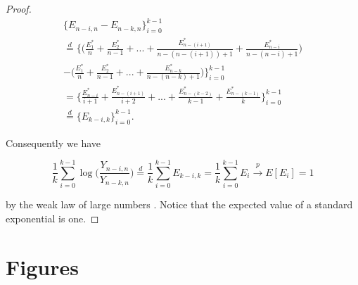 \documentclass[english,12pt,a4paper,pdftex,sci,utf8]{aaltothesis} %
\begin{document}
\begin{proof}
\begin{equation*}
\begin{split}
\big\{E_{n-i,n} - E_{n-k,n}\big\}_{i=0}^{k-1} \\ 
\overset{d}{=} \bigg\{\Big( \frac{E_1^*}{n} + \frac{E_2^*}{n-1}+...+ \frac{E_{n-(i+1)}^*}{n-(n-(i+1))+1} + \frac{E_{n-i}^*}{n-(n-i)+1} \Big) \\
- \Big(\frac{E_1^*}{n} + \frac{E_2^*}{n-1}+...+\frac{E_{n-k}^*}{n-(n-k)+1}\Big)\bigg\}_{i=0}^{k-1} \\
= \bigg\{\frac{E_{n-i}^*}{i+1} + \frac{E_{n-(i+1)}^*}{i+2} +...+ \frac{E_{n-(k-2)}^*}{k-1} + \frac{E_{n-(k-1)}^*}{k}\bigg\}_{i=0}^{k-1} \\
\overset{d}{=} \big\{E_{k-i,k}\big\}_{i=0}^{k-1}.
\end{split}
\end{equation*}

Consequently we have

\begin{equation*}
\frac{1}{k} \sum_{i=0}^{k-1} \log\Big(\frac{Y_{n-i,n}}{Y_{n-k,n}}\Big) \overset{d}{=} \frac{1}{k} \sum_{i=0}^{k-1} E_{k-i,k} = \frac{1}{k} \sum_{i=0}^{k-1} E_i \xrightarrow{p} E[E_i] = 1
\end{equation*}

by the weak law of large numbers \cite{rosenthal}. Notice that the expected value of a standard exponential is one.



\end{proof}

\section{Figures}
\label{figures}
\end{document}
